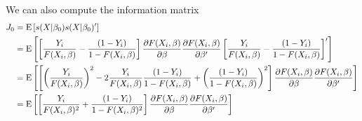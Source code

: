 We can also compute the information matrix \begin{align*}
J_0 & = \operatorname{E}\left[s(X\vert\beta_0)s(X\vert\beta_0)'\right] \\ &= \operatorname{E}\left[\left[\frac{Y_i}{F(X_i,\beta)} - \frac{(1 - Y_i)}{1 - F(X_i,\beta)}\right]\frac{\partial F(X_i,\beta)}{\partial\beta} \frac{\partial F(X_i,\beta)}{\partial\beta'}\left[\frac{Y_i}{F(X_i,\beta)} - \frac{(1 - Y_i)}{1 - F(X_i,\beta)}\right]'\right] \\ & = \operatorname{E}\left[\left[\left(\frac{Y_i}{F(X_i,\beta)}\right)^2 - 2\frac{Y_i}{F(X_i,\beta)} \frac{(1 - Y_i)}{1 - F(X_i,\beta)} + \left(\frac{(1 - Y_i)}{1 - F(X_i,\beta)}\right)^2 \right] \frac{\partial F(X_i,\beta)}{\partial\beta} \frac{\partial F(X_i,\beta)}{\partial\beta'}\right] \\ & = \operatorname{E}\left[\left[\frac{Y_i}{F(X_i,\beta)^2} + \frac{(1 - Y_i)}{1 - F(X_i,\beta)^2}\right] \frac{\partial F(X_i,\beta)}{\partial\beta} \frac{\partial F(X_i,\beta)}{\partial\beta'}\right]
\end{align*}